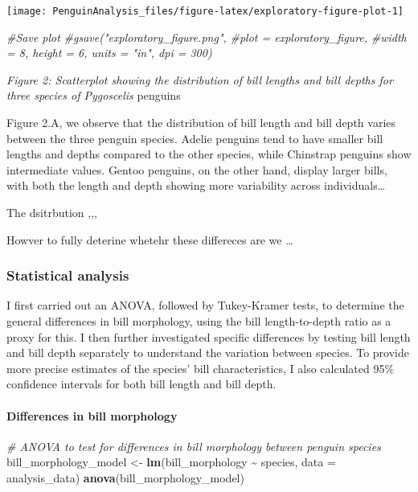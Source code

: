 \documentclass[
]{article}
\newenvironment{Shaded}{\begin{snugshade}}{\end{snugshade}}
\newcommand{\AttributeTok}[1]{\textcolor[rgb]{0.13,0.29,0.53}{#1}}
\newcommand{\CommentTok}[1]{\textcolor[rgb]{0.56,0.35,0.01}{\textit{#1}}}
\newcommand{\FunctionTok}[1]{\textcolor[rgb]{0.13,0.29,0.53}{\textbf{#1}}}
\newcommand{\NormalTok}[1]{#1}
\newcommand{\OtherTok}[1]{\textcolor[rgb]{0.56,0.35,0.01}{#1}}
\newcommand{\SpecialCharTok}[1]{\textcolor[rgb]{0.81,0.36,0.00}{\textbf{#1}}}
\begin{document}
\begin{center}\texttt{[image: PenguinAnalysis\_files/figure-latex/exploratory-figure-plot-1]} \end{center}

\begin{Shaded}
\begin{Highlighting}[]
\CommentTok{\#Save plot }
\CommentTok{\#gsave("exploratory\_figure.png", }
       \CommentTok{\#plot = exploratory\_figure, }
       \CommentTok{\#width = 8, height = 6, units = "in", dpi = 300)  }
\end{Highlighting}
\end{Shaded}

\emph{Figure 2: Scatterplot showing the distribution of bill lengths and
bill depths for three species of Pygoscelis} penguins

Figure 2.A, we observe that the distribution of bill length and bill
depth varies between the three penguin species. Adelie penguins tend to
have smaller bill lengths and depths compared to the other species,
while Chinstrap penguins show intermediate values. Gentoo penguins, on
the other hand, display larger bills, with both the length and depth
showing more variability across individuals\ldots{}

The dsitrbution ,,,

Howver to fully deterine whetehr these differeces are we \ldots{}

\subsubsection{Statistical analysis}\label{statistical-analysis-1}

I first carried out an ANOVA, followed by Tukey-Kramer tests, to
determine the general differences in bill morphology, using the bill
length-to-depth ratio as a proxy for this. I then further investigated
specific differences by testing bill length and bill depth separately to
understand the variation between species. To provide more precise
estimates of the species' bill characteristics, I also calculated 95\%
confidence intervals for both bill length and bill depth.

\paragraph{Differences in bill
morphology}\label{differences-in-bill-morphology}

\begin{Shaded}
\begin{Highlighting}[]
\CommentTok{\# ANOVA to test for differences in bill morphology between penguin species}
\NormalTok{bill\_morphology\_model }\OtherTok{\textless{}{-}} \FunctionTok{lm}\NormalTok{(bill\_morphology }\SpecialCharTok{\textasciitilde{}}\NormalTok{ species, }\AttributeTok{data =}\NormalTok{ analysis\_data)}
\FunctionTok{anova}\NormalTok{(bill\_morphology\_model)}
\end{Highlighting}
\end{Shaded}
\end{document}
